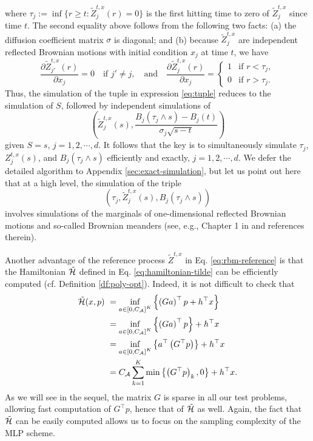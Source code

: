 \documentclass[11pt]{article}
\theoremstyle{definition}
\theoremstyle{plain}
\newcommand{\cH}{{\cal H}}
\begin{document}
where $\tau_j := \inf\{r \ge t : \tilde Z_j^{t,x}(r) = 0\}$ is the first hitting time to zero of $\tilde Z_j^{t,x}$ since time $t$. 
The second equality above follows from the following two facts: (a) the diffusion coefficient matrix $\sigma$ is diagonal; and 
(b) because $\tilde Z_j^{t,x}$ are independent reflected Brownian motions with initial condition $x_j$ at time $t$, we have
\[
\frac{\partial \tilde Z_{j'}^{t,x}(r)}{\partial x_{j}} = 0 \quad \text{if } j' \neq j, \quad \text{and} \quad
\frac{\partial \tilde Z_j^{t,x}(r)}{\partial x_j} = \left\{ \begin{array}{ll}
1 & \text{if } r < \tau_j, \\
0 & \text{if } r > \tau_j.
\end{array}\right.
\]
Thus, the simulation of the tuple in expression \eqref{eq:tuple} reduces to the simulation of $S$, followed by 
independent simulations of 
\[
\left(\tilde Z^{t,x}_j(s), \frac{B_j(\tau_j\wedge s) - B_j(t)}{\sigma_j \sqrt{s-t}}\right)
\]
given $S=s$, $j = 1, 2, \cdots, d$. 
It follows that the key is to simultaneously simulate $\tau_j$, $Z^{t,x}_j(s)$, and $B_j(\tau_j\wedge s)$ 
efficiently and exactly, $j=1,2,\cdots,d$. We defer the detailed algorithm to Appendix \ref{sec:exact-simulation}, 
but let us point out here that at a high level, the simulation of the triple 
\begin{equation}\label{eq:triple}
\left(\tau_j, \tilde Z^{t,x}_j(s), B_j(\tau_j\wedge s)\right)
\end{equation} 
involves simulations of the marginals of one-dimensional 
reflected Brownian motions and so-called Brownian meanders (see, e.g., Chapter 1 in \cite{DevroyeKarasozenKohlerKorn2010} and references therein).  

Another advantage of the reference process $\tilde Z^{t,x}$ in Eq. \eqref{eq:rbm-reference} is that
the Hamiltonian $\tilde \cH$ defined in Eq. \eqref{eq:hamiltonian-tilde} can be efficiently computed 
(cf. Definition \ref{df:poly-opt}). 
Indeed, it is not difficult to check that 
\begin{align}
\tilde \cH (x, p) &~= \inf_{a \in \left[0, C_{\mathcal{A}}\right]^K} \left\{\left(Ga\right)^\top p + h^\top x\right\} \nonumber\\
&~= \inf_{a \in \left[0, C_{\mathcal{A}}\right]^K} \left\{\left(Ga\right)^\top p \right\} + h^\top x \nonumber\\
&~= \inf_{a \in \left[0, C_{\mathcal{A}}\right]^K} \left\{a^\top \left(G^\top p\right) \right\} + h^\top x \nonumber \\
&~= C_{\mathcal{A}} \sum_{k=1}^K \min\left\{\left(G^\top p\right)_k, 0\right\} + h^\top x. \label{eq:pss-mlp-cH}
\end{align}
As we will see in the sequel, the matrix $G$ is sparse in all our test problems, 
allowing fast computation of $G^\top p$, hence that of $\tilde \cH$ as well. 
Again, the fact that $\tilde \cH$ can be easily computed allows us to focus on the sampling complexity of the MLP scheme. 
\end{document}
